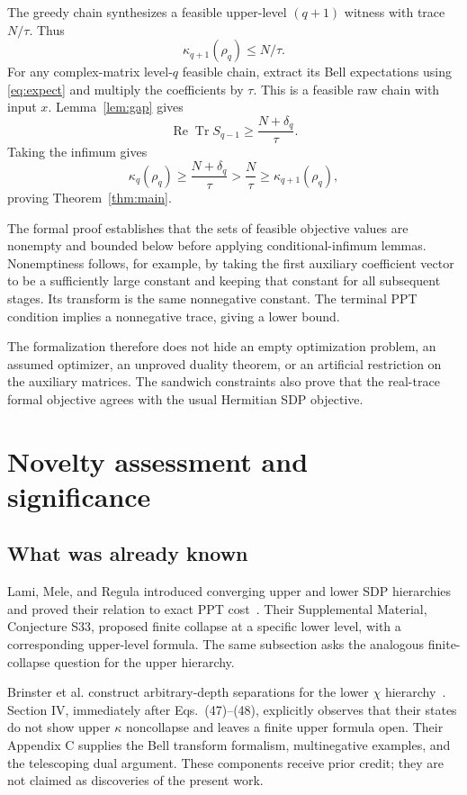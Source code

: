 \documentclass[11pt]{article}
\newcommand{\Tr}{\operatorname{Tr}}
\begin{document}
The greedy chain synthesizes a feasible upper-level $(q+1)$ witness with
trace $N/\tau$. Thus
\[
\kappa_{q+1}(\rho_q)\le N/\tau.
\]
For any complex-matrix level-$q$ feasible chain, extract its Bell
expectations using \eqref{eq:expect} and multiply the coefficients by $\tau$.
This is a feasible raw chain with input $x$. Lemma~\ref{lem:gap} gives
\[
\operatorname{Re}\Tr S_{q-1}\ge\frac{N+\delta_q}{\tau}.
\]
Taking the infimum gives
\begin{equation}\label{eq:normalizedgap}
\kappa_q(\rho_q)\ge\frac{N+\delta_q}{\tau}
>\frac N\tau\ge\kappa_{q+1}(\rho_q),
\end{equation}
proving Theorem~\ref{thm:main}.

The formal proof establishes that the sets of feasible objective values are
nonempty and bounded below before applying conditional-infimum lemmas.
Nonemptiness follows, for example, by taking the first auxiliary coefficient
vector to be a sufficiently large constant and keeping that constant for
all subsequent stages. Its transform is the same nonnegative constant.
The terminal PPT condition implies a nonnegative trace, giving a lower bound.

The formalization therefore does not hide an empty optimization problem, an
assumed optimizer, an unproved duality theorem, or an artificial restriction
on the auxiliary matrices. The sandwich constraints also prove that the
real-trace formal objective agrees with the usual Hermitian SDP objective.

\section{Novelty assessment and significance}\label{sec:novelty}
\subsection{What was already known}
Lami, Mele, and Regula introduced converging upper and lower SDP hierarchies
and proved their relation to exact PPT cost~\cite{LMR}. Their Supplemental
Material, Conjecture S33, proposed finite collapse at a specific lower level,
with a corresponding upper-level formula. The same subsection asks the
analogous finite-collapse question for the upper hierarchy.

Brinster et al. construct arbitrary-depth separations for the lower $\chi$
hierarchy~\cite{Brinster}. Section IV, immediately after Eqs.\ (47)--(48),
explicitly observes that their states do not show upper $\kappa$ noncollapse
and leaves a finite upper formula open. Their Appendix C supplies the Bell
transform formalism, multinegative examples, and the telescoping dual argument.
These components receive prior credit; they are not claimed as discoveries
of the present work.
\end{document}
